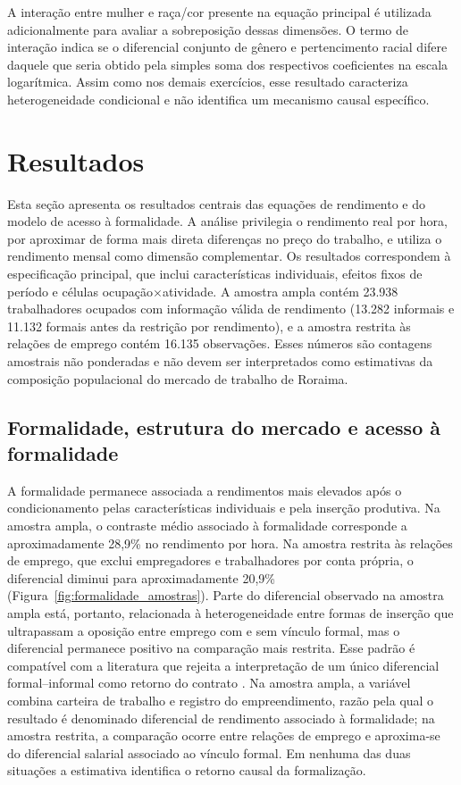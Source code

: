 \documentclass[12pt,a4paper]{article}
\begin{document}
A interação entre mulher e raça/cor presente na equação principal é utilizada
adicionalmente para avaliar a sobreposição dessas dimensões. O termo de
interação indica se o diferencial conjunto de gênero e pertencimento racial
difere daquele que seria obtido pela simples soma dos respectivos coeficientes
na escala logarítmica. Assim como nos demais exercícios, esse resultado
caracteriza heterogeneidade condicional e não identifica um mecanismo causal
específico.

\section{Resultados}
\label{sec:resultados}

Esta seção apresenta os resultados centrais das equações de rendimento e do
modelo de acesso à formalidade. A análise privilegia o rendimento real por hora,
por aproximar de forma mais direta diferenças no preço do trabalho, e utiliza o
rendimento mensal como dimensão complementar. Os resultados correspondem à
especificação principal, que inclui características individuais, efeitos fixos de
período e células ocupação$\times$atividade. A amostra ampla contém 23.938
trabalhadores ocupados com informação válida de rendimento (13.282 informais e
11.132 formais antes da restrição por rendimento), e a amostra restrita às
relações de emprego contém 16.135 observações. Esses números são contagens
amostrais não ponderadas e não devem ser interpretados como estimativas da
composição populacional do mercado de trabalho de Roraima.

\subsection{Formalidade, estrutura do mercado e acesso à formalidade}
\label{subsec:resultados_formalidade}

A formalidade permanece associada a rendimentos mais elevados após o
condicionamento pelas características individuais e pela inserção produtiva.
Na amostra ampla, o contraste médio associado à formalidade corresponde a
aproximadamente 28,9\% no rendimento por hora. Na amostra restrita às relações
de emprego, que exclui empregadores e trabalhadores por conta própria, o
diferencial diminui para aproximadamente 20,9\%
(Figura~\ref{fig:formalidade_amostras}). Parte do diferencial observado na
amostra ampla está, portanto, relacionada à heterogeneidade entre formas de
inserção que ultrapassam a oposição entre emprego com e sem vínculo formal, mas
o diferencial permanece positivo na comparação mais restrita. Esse padrão é
compatível com a literatura que rejeita a interpretação de um único diferencial
formal--informal como retorno do contrato \citep{curi2006, meghir2015, ulyssea2018}.
Na amostra ampla, a variável combina carteira de trabalho e registro do
empreendimento, razão pela qual o resultado é denominado diferencial de
rendimento associado à formalidade; na amostra restrita, a comparação ocorre
entre relações de emprego e aproxima-se do diferencial salarial associado ao
vínculo formal. Em nenhuma das duas situações a estimativa identifica o retorno
causal da formalização.
\end{document}
